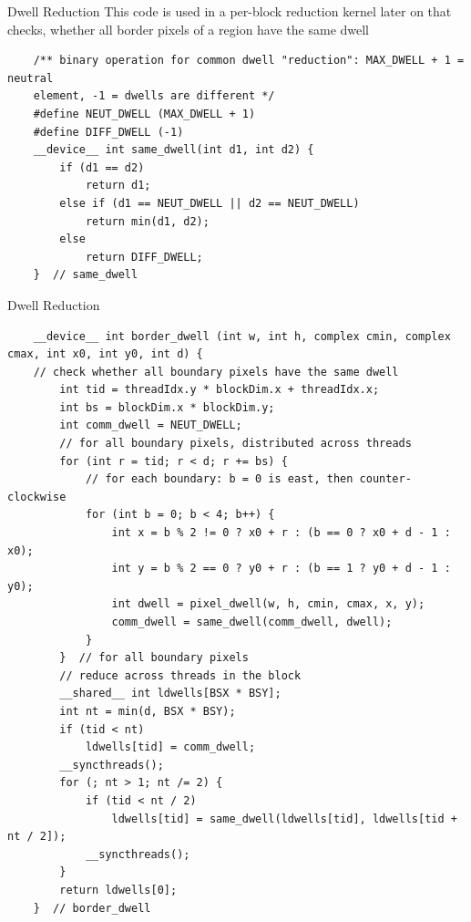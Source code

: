 \documentclass[fleqn,11pt,aspectratio=43]{beamer}
\begin{document}
\begin{frame}[fragile]{Dwell Reduction}
	This code is used in a per-block reduction kernel later on that checks, whether all border pixels of a region have the same dwell
	\begin{verbatim}
	/** binary operation for common dwell "reduction": MAX_DWELL + 1 = neutral
	element, -1 = dwells are different */
	#define NEUT_DWELL (MAX_DWELL + 1)
	#define DIFF_DWELL (-1)
	__device__ int same_dwell(int d1, int d2) {
		if (d1 == d2)
			return d1;
		else if (d1 == NEUT_DWELL || d2 == NEUT_DWELL)
			return min(d1, d2);
		else
			return DIFF_DWELL;
	}  // same_dwell
	\end{verbatim}
\end{frame}

\begin{frame}[fragile]{Dwell Reduction}
	\begin{verbatim}
	__device__ int border_dwell (int w, int h, complex cmin, complex cmax, int x0, int y0, int d) {
	// check whether all boundary pixels have the same dwell
		int tid = threadIdx.y * blockDim.x + threadIdx.x;
		int bs = blockDim.x * blockDim.y;
		int comm_dwell = NEUT_DWELL;
		// for all boundary pixels, distributed across threads
		for (int r = tid; r < d; r += bs) {
			// for each boundary: b = 0 is east, then counter-clockwise
			for (int b = 0; b < 4; b++) {
				int x = b % 2 != 0 ? x0 + r : (b == 0 ? x0 + d - 1 : x0);
				int y = b % 2 == 0 ? y0 + r : (b == 1 ? y0 + d - 1 : y0);
				int dwell = pixel_dwell(w, h, cmin, cmax, x, y);
				comm_dwell = same_dwell(comm_dwell, dwell);
			}
		}  // for all boundary pixels
		// reduce across threads in the block
		__shared__ int ldwells[BSX * BSY];
		int nt = min(d, BSX * BSY);
		if (tid < nt)
			ldwells[tid] = comm_dwell;
		__syncthreads();
		for (; nt > 1; nt /= 2) {
			if (tid < nt / 2)
				ldwells[tid] = same_dwell(ldwells[tid], ldwells[tid + nt / 2]);
			__syncthreads();
		}
		return ldwells[0];
	}  // border_dwell
	\end{verbatim}
\end{frame}
\end{document}
